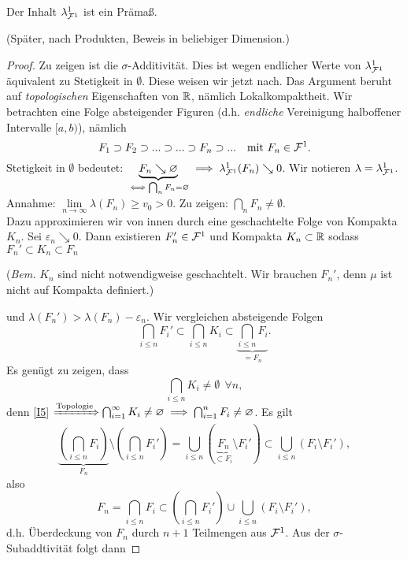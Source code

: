 \begin{satz}
\begin{mdframed}
Der Inhalt $\lambda^1_{\FF^1}$ ist ein Prämaß.
\end{mdframed}
(Später, nach Produkten, Beweis in beliebiger Dimension.)
\begin{proof}
Zu zeigen ist die $\sigma$-Additivität. Dies ist wegen endlicher Werte von $\lambda^1_{\FF^1}$ äquivalent zu Stetigkeit in $\emptyset$. Diese weisen wir jetzt nach. Das Argument beruht auf \emph{topologischen} Eigenschaften von $\R$, nämlich Lokalkompaktheit. Wir betrachten eine Folge absteigender Figuren (d.h. \emph{endliche} Vereinigung halboffener Intervalle $[a,b)$), nämlich
$$F_1 \supset F_2 \supset ... \supset ... \supset F_n \supset ...  \quad  \text{mit } F_n \in \FF^1.$$
Stetigkeit in $\emptyset$ bedeutet: $\underbrace{F_n \searrow \emptyset}_{\iff \bigcap_n F_n = \emptyset} \implies \lambda^1_{\FF^1}(F_n) \searrow 0$. Wir notieren $\lambda = \lambda^1_{\FF^1}$.
Annahme: $\lim\limits_{n \to \infty} \lambda(F_n) \geq v_0 >0$. Zu zeigen: $\bigcap_n F_n \neq \emptyset$.\\
Dazu approximieren wir von innen durch eine geschachtelte Folge von Kompakta $K_n$.
Sei $\varepsilon_n \searrow 0$. Dann existieren $F_n' \in \FF^1$ und Kompakta $K_n \subset \R$ sodass $F_n' \subset K_n \subset F_n$ \begin{scriptsize} (\textit{Bem.} $K_n$ sind nicht notwendigweise geschachtelt. Wir brauchen $F_n'$, denn $\mu$ ist nicht auf Kompakta definiert.) \end{scriptsize}und $\lambda(F_n') > \lambda(F_n) -\varepsilon_n$. Wir vergleichen absteigende Folgen
$$ \bigcap_{i\leq n} F_i' \subset \bigcap_{i \leq n} K_i \subset \underbrace{\bigcap_{i \leq n} F_i}_{= F_n}.$$
Es genügt zu zeigen, dass
\begin{equation}\label{I5}
\bigcap_{i \leq n} K_i \neq \emptyset \  \ \forall n,
\end{equation}
denn \eqref{I5} $ \xRightarrow{\text{Topologie}} \bigcap_{i=1}^\infty K_i \neq \emptyset \implies \bigcap_{i=1}^n F_i \neq \emptyset$. \newline
Es gilt
$$
\underbrace{\left( \bigcap_{i \leq n} F_i \right)}_{F_n} \setminus \left( \bigcap_{i \leq n} F_i' \right) = \bigcup_{i \leq n} (\underbrace{F_n}_{\subset F_i} \setminus F_i') \subset \bigcup_{i \leq n}(F_i \setminus F_i'),
$$
also
$$F_n = {\bigcap_{i\leq n} F_i} \subset \left( \bigcap_{i \leq n} F_i' \right) \cup \bigcup_{i \leq n} (F_i \setminus F_i'),$$
d.h. Überdeckung von $F_n$ durch $n+1$ Teilmengen aus $\FF^1$. Aus der $\sigma$-Subaddtivität folgt dann

\end{proof}
\end{satz}
